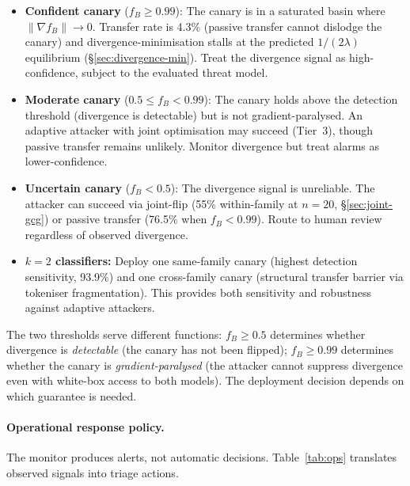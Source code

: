 \begin{itemize}
\item \textbf{Confident canary} ($f_B \geq 0.99$): The canary is in a saturated basin where $\|\nabla f_B\| \to 0$. Transfer rate is 4.3\% (passive transfer cannot dislodge the canary) and divergence-minimisation stalls at the predicted $1/(2\lambda)$ equilibrium (\S\ref{sec:divergence-min}). Treat the divergence signal as high-confidence, subject to the evaluated threat model.
\item \textbf{Moderate canary} ($0.5 \leq f_B < 0.99$): The canary holds above the detection threshold (divergence is detectable) but is not gradient-paralysed. An adaptive attacker with joint optimisation may succeed (Tier~3), though passive transfer remains unlikely. Monitor divergence but treat alarms as lower-confidence.
\item \textbf{Uncertain canary} ($f_B < 0.5$): The divergence signal is unreliable. The attacker can succeed via joint-flip (55\% within-family at $n{=}20$, \S\ref{sec:joint-gcg}) or passive transfer (76.5\% when $f_B < 0.99$). Route to human review regardless of observed divergence.
\item \textbf{$k = 2$ classifiers:} Deploy one same-family canary (highest detection sensitivity, 93.9\%) and one cross-family canary (structural transfer barrier via tokeniser fragmentation). This provides both sensitivity and robustness against adaptive attackers.
\end{itemize}

\noindent The two thresholds serve different functions: $f_B \geq 0.5$ determines whether divergence is \emph{detectable} (the canary has not been flipped); $f_B \geq 0.99$ determines whether the canary is \emph{gradient-paralysed} (the attacker cannot suppress divergence even with white-box access to both models). The deployment decision depends on which guarantee is needed.

\paragraph{Operational response policy.} The monitor produces alerts, not automatic decisions. Table~\ref{tab:ops} translates observed signals into triage actions.

